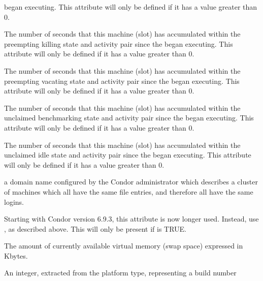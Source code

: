 \begin{description}
began executing.
This attribute will only be defined if it has a value greater than 0.
%
\item[\AdAttr{TotalTimePreemptingKilling}:] The number of seconds
that this machine (slot) has accumulated within the
preempting killing state and activity pair since the 
began executing.
This attribute will only be defined if it has a value greater than 0.
%
\item[\AdAttr{TotalTimePreemptingVacating}:] The number of seconds
that this machine (slot) has accumulated within the
preempting vacating state and activity pair since the 
began executing.
This attribute will only be defined if it has a value greater than 0.
%
\item[\AdAttr{TotalTimeUnclaimedBenchmarking}:] The number of seconds
that this machine (slot) has accumulated within the
unclaimed benchmarking state and activity pair since the 
began executing.
This attribute will only be defined if it has a value greater than 0.
%
\item[\AdAttr{TotalTimeUnclaimedIdle}:] The number of seconds
that this machine (slot) has accumulated within the
unclaimed idle state and activity pair since the 
began executing.
This attribute will only be defined if it has a value greater than 0.
%
\item[\AdAttr{UidDomain}:] a domain name configured by the Condor 
administrator which describes a cluster of machines which all have 
the same  file entries, and therefore all have the same logins.
%
\item[\AdAttr{VirtualMachineID}:] 
Starting with Condor version 6.9.3, this attribute is now longer used.
Instead, use , as described above.
This will only be present if  is TRUE.
%
\item[\AdAttr{VirtualMemory}:] The amount of currently available virtual memory 
(swap space) expressed in Kbytes.
%
\item[\AdAttr{WindowsBuildNumber}:] An integer, extracted from the
platform type, representing a build number 

\end{description}
